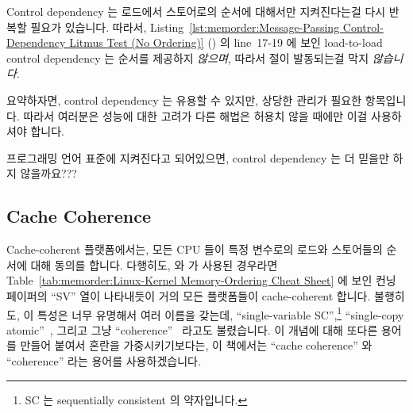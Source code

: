 Control dependency 는 로드에서 스토어로의 순서에 대해서만 지켜진다는걸 다시
반복할 필요가 있습니다.
따라서,
Listing~\ref{lst:memorder:Message-Passing Control-Dependency Litmus Test (No Ordering)}
()
의 line~17-19 에 보인 load-to-load control dependency 는 순서를 제공하지
\emph{않으며}, 따라서  절이 발동되는걸 막지 \emph{않습니다}.

요약하자면, control dependency 는 유용할 수 있지만, 상당한 관리가 필요한
항목입니다.
따라서 여러분은 성능에 대한 고려가 다른 해법은 허용치 않을 때에만 이걸
사용하셔야 합니다.

\QuickQuiz{}
	프로그래밍 언어 표준에 지켜진다고 되어있으면, control dependency 는 더
	믿을만 하지 않을까요???

\QuickQuizAnswer{
	시간이 흐르면, 어쩌면 그렇게 표준이 만들어질 수 있을 겁니다.

} \QuickQuizEnd

\subsection{Cache Coherence}
\label{sec:memorder:Cache Coherence}

Cache-coherent 플랫폼에서는, 모든 CPU 들이 특정 변수로의 로드와 스토어들의
순서에 대해 동의를 합니다.
다행히도,  와  가 사용된 경우라면
Table~\ref{tab:memorder:Linux-Kernel Memory-Ordering Cheat Sheet}
에 보인 컨닝 페이퍼의 ``SV'' 열이 나타내듯이 거의 모든 플랫폼들이
cache-coherent 합니다.
불행히도, 이 특성은 너무 유명해서 여러 이름을 갖는데, ``single-variable
SC'',\footnote{
	SC 는 sequentially consistent 의 약자입니다.}
``single-copy atomic''~\cite{Stone:1995:SP:623262.623912}, 그리고 그냥
``coherence''~\cite{JadeAlglave2011ppcmem} 라고도 불렸습니다.
이 개념에 대해 또다른 용어를 만들어 붙여서 혼란을 가중시키기보다는, 이 책에서는
``cache coherence'' 와 ``coherence'' 라는 용어를 사용하겠습니다.
\iffalse

